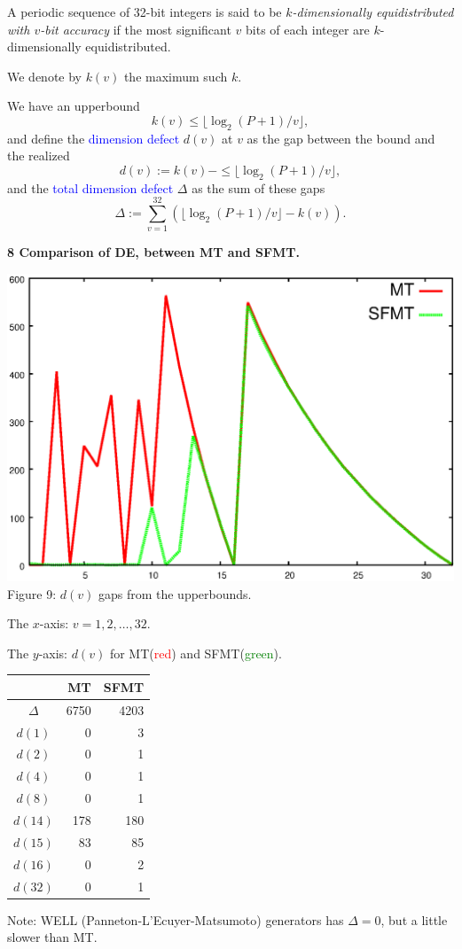 \documentclass[a4j,12pt,landscape]{jarticle}
\begin{document}
\newpage
A periodic sequence of 32-bit integers is said to be
{\em $k$-dimensionally equidistributed with $v$-bit accuracy}
if the most significant $v$ bits of each integer are
$k$-dimensionally equidistributed. 

We denote by $k(v)$ the maximum such $k$. 

\vskip 5mm
We have an upperbound 
$$
k(v) \leq \lfloor \log_2 (P+1) / v \rfloor, 
$$
and define the \textcolor{blue}{dimension defect} $d(v)$ at $v$
as the gap between the bound and the realized
$$
d(v):= k(v) - \leq \lfloor \log_2 (P+1) / v \rfloor, 
$$
and the \textcolor{blue}{total dimension defect} $\Delta$
as the sum of these gaps 
$$
\Delta := \sum_{v=1}^{32}(\lfloor \log_2 (P+1) / v \rfloor -k(v)).
$$

\newpage
{\bf 8 Comparison of DE, between MT and SFMT.}
\begin{center}
\parbox{17cm}{
\includegraphics[width=0.8\linewidth,height=0.7\textheight,
keepaspectratio]{delta.eps}
\\
Figure 9: $d(v)$ gaps from the upperbounds.

The $x$-axis: $v=1,2,\ldots, 32$.

The $y$-axis: $d(v)$ for 
MT(\textcolor{red}{red}) and SFMT(\textcolor{green}{green}).
}
\parbox{5cm}{
\vskip -2.5cm
\hskip -1.5cm
{\LARGE
\begin{tabular}{crr} \hline
  & MT & SFMT \\ \hline\hline
  $\Delta$ & 6750 & 4203 \\
  $d(1)$ & 0 & 3 \\
  $d(2)$ & 0 & 1 \\
  $d(4)$ & 0 & 1 \\
  $d(8)$ & 0 & 1 \\
  $d(14)$ & 178 & 180 \\
  $d(15)$ & 83 & 85 \\
  $d(16)$ & 0 & 2 \\
  $d(32)$ & 0 & 1 \\ \hline
\end{tabular}
}
}
\end{center}
Note: WELL (Panneton-L'Ecuyer-Matsumoto) generators 
has $\Delta = 0$, but a little slower than MT.
\end{document}
